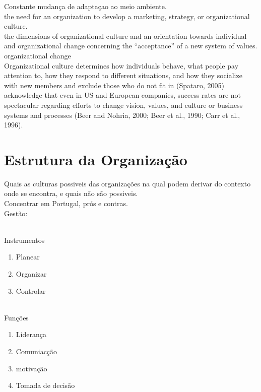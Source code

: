 Constante mudança de adaptaçao ao meio ambiente.\\

the need for an organization to develop a marketing, strategy, or organizational culture.\\
the dimensions of organizational culture and an orientation towards individual and organizational change concerning the “acceptance” of a new system of values.\\

organizational change \\

Organizational culture determines how individuals behave, what people pay attention to,
how they respond to different situations, and how they socialize with new members and
exclude those who do not fit in (Spataro, 2005) \\

acknowledge that even in US and European companies, success rates are
not spectacular regarding efforts to change vision, values, and culture or business systems
and processes (Beer and Nohria, 2000; Beer et al., 1990; Carr et al., 1996).\\



\section{Estrutura da Organização}
Quais as culturas possiveis das organizações na qual podem derivar do contexto onde se encontra, e quais não são possiveis.\\

Concentrar em Portugal, prós e contras.\\





\newpage
Gestão:\\ \\
\begin{minipage}{20cm}
\begin{minipage}{5cm}
Instrumentos
\begin{enumerate}
\item Planear
\item Organizar
\item Controlar\\ \\
\end{enumerate}
\end{minipage}
\begin{minipage}{5cm}
Funções
\begin{enumerate}
\item Liderança
\item Comuniacção
\item motivação
\item Tomada de decisão
\end{enumerate}
\end{minipage}
\end{minipage}



